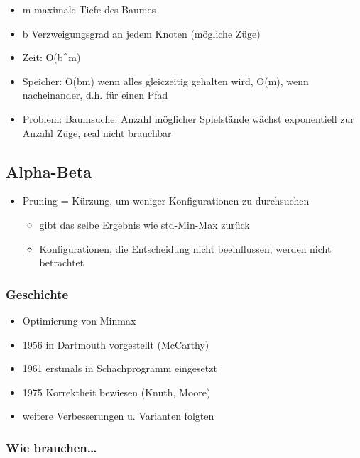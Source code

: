 \documentclass[]{article}
\begin{document}
\begin{itemize}
\item
  m maximale Tiefe des Baumes
\item
  b Verzweigungsgrad an jedem Knoten (mögliche Züge)
\item
  Zeit: O(b\^{}m)
\item
  Speicher: O(bm) wenn alles gleiczeitig gehalten wird, O(m), wenn
  nacheinander, d.h. für einen Pfad
\item
  Problem: Baumsuche: Anzahl möglicher Spielstände wächst exponentiell
  zur Anzahl Züge, real nicht brauchbar
\end{itemize}

\hypertarget{header-n526}{%
\subsection{Alpha-Beta}\label{header-n526}}

\begin{itemize}
\item
  Pruning = Kürzung, um weniger Konfigurationen zu durchsuchen

  \begin{itemize}
  \item
    gibt das selbe Ergebnis wie std-Min-Max zurück
  \item
    Konfigurationen, die Entscheidung nicht beeinflussen, werden nicht
    betrachtet
  \end{itemize}
\end{itemize}

\hypertarget{header-n780}{%
\subsubsection{Geschichte}\label{header-n780}}

\begin{itemize}
\item
  Optimierung von Minmax
\item
  1956 in Dartmouth vorgestellt (McCarthy)
\item
  1961 erstmals in Schachprogramm eingesetzt
\item
  1975 Korrektheit bewiesen (Knuth, Moore)
\item
  weitere Verbesserungen u. Varianten folgten
\end{itemize}

\hypertarget{header-n943}{%
\subsubsection{Wie brauchen\ldots{}}\label{header-n943}}
\end{document}
